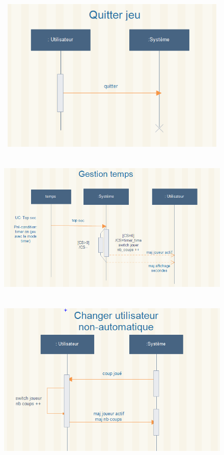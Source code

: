 \begin{figure}[ht]
\begin{center}
  \includegraphics[width = 35em, height=20em]{images/seq/quitter.png}
\end{center}
\end{figure}

\begin{figure}[ht]
\begin{center}
  \includegraphics[width = 35em, height=20em]{images/seq/gestion_temps.png}
\end{center}
\end{figure}

\begin{figure}[ht]
\begin{center}
  \includegraphics[width = 35em, height=20em]{images/seq/changer_joueur.png}
\end{center}
\end{figure}

